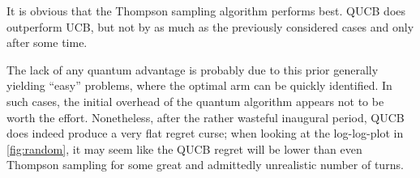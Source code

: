 
It is obvious that the Thompson sampling algorithm performs best.
QUCB does outperform UCB, but not by as much as the previously considered cases and only after some time.

The lack of any quantum advantage is probably due to this prior generally yielding \enquote{easy} problems, where the optimal arm can be quickly identified.
In such cases, the initial overhead of the quantum algorithm appears not to be worth the effort.
Nonetheless, after the rather wasteful inaugural period, QUCB does indeed produce a very flat regret curse; when looking at the log-log-plot in \cref{fig:random}, it may seem like the QUCB regret will be lower than even Thompson sampling for some great and admittedly unrealistic number of turns.



